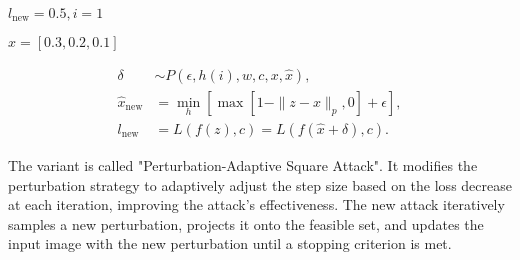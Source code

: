 $l_{\text{new}} = 0.5, i = 1$


$\hat{x} = [0.3, 0.2, 0.1]$


\begin{align*}
\delta &\sim P(\epsilon, h(i), w, c, x, \hat{x}), \\
\hat{x}_{\text{new}} &= \min_{h}\left[\max\left[1 - \|z - x\|_p, 0\right] + \epsilon\right], \\
l_{\text{new}} &= L(f(z), c) = L(f(\hat{x} + \delta), c).
\end{align*}

The variant is called "Perturbation-Adaptive Square Attack". It modifies the perturbation strategy to adaptively adjust the step size based on the loss decrease at each iteration, improving the attack's effectiveness. The new attack iteratively samples a new perturbation, projects it onto the feasible set, and updates the input image with the new perturbation until a stopping criterion is met.